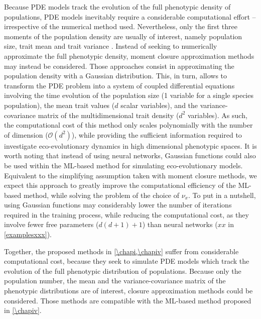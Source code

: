 Because PDE models track the evolution of the full phenotypic density of populations, PDE models inevitably require a considerable computational effort -- irrespective of the numerical method used. 
% 
Nevertheless, only the first three moments of the population density are usually of interest, namely population size, trait mean and trait variance \citep{Nordbotten2020}. 
% 
Instead of seeking to numerically approximate the full phenotypic density, moment closure approximation methods \citep{Wickman2021,Lion2022,Nordbotten2020} may instead be considered. Those approaches consist in approximating the population density with a Gaussian distribution. This, in turn, allows to transform the PDE problem into a system of coupled differential equations involving the time evolution of the population size (1 variable for a single species population), the mean trait values ($d$ scalar variables), and the variance-covariance matrix of the multidimensional trait density ($d^2$ variables). As such, the computational cost of this method only scales polynomially with the number of dimension ($\mathcal{O}(d^2)$), while providing the sufficient information required to investigate eco-evolutionary dynamics in high dimensional phenotypic spaces. 
% 
It is worth noting that instead of using neural networks, Gaussian functions could also be used within the ML-based method for simulating eco-evolutionary models. Equivalent to the simplifying assumption taken with moment closure methods, we expect this approach to greatly improve the computational efficiency of the ML-based method, while solving the problem of the choice of $\nu_x$. To put in a nutshell, using Gaussian functions may considerably lower the number of iterations required in the training process, while reducing the computational cost, as they involve fewer free parameters ($d(d+1) + 1$) than neural networks ($xx$ in \cref{examplesxxx}).

Together, the proposed methods in \cref{\chapi,\chapiv} suffer from considerable computational cost, because they seek to simulate PDE models which track the evolution of the full phenotypic distribution of populations. Because only the population number, the mean and the variance-covariance matrix of the phenotypic distributions are of interest, closure approximation methods could be considered. Those methods are compatible with the ML-based method proposed in \cref{\chapiv}.


